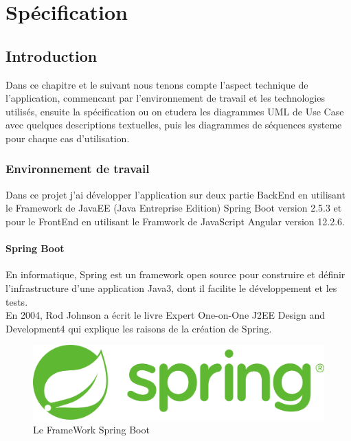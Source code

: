 \documentclass[12pt]{report}
\begin{document}
\chapter{Spécification}

\section*{Introduction}

Dans ce chapitre et le suivant nous tenons compte l'aspect technique de l'application, commencant
par l'environnement de travail et les technologies utilisés, ensuite la spécification ou on etudera les diagrammes UML de Use Case avec quelques descriptions textuelles, puis les diagrammes de séquences systeme pour chaque cas d'utilisation.

\subsection{Environnement de travail}

Dans ce projet j'ai développer l'application sur deux partie BackEnd en utilisant le Framework de JavaEE (Java Entreprise Edition) Spring Boot version 2.5.3 et pour le FrontEnd en utilisant le Framwork de JavaScript Angular version 12.2.6.

\subsubsection{Spring Boot}


En informatique, Spring est un framework open source pour construire et définir l'infrastructure d'une application Java3, dont il facilite le développement et les tests.
\\En 2004, Rod Johnson a écrit le livre Expert One-on-One J2EE Design and Development4 qui explique les raisons de la création de Spring.\\
\begin{figure}[h]
    \centering
    \includegraphics[width=.5\textwidth]{spring}
    \caption{Le FrameWork Spring Boot}
    \label{fig:mesh5}
\end{figure}
\end{document}
